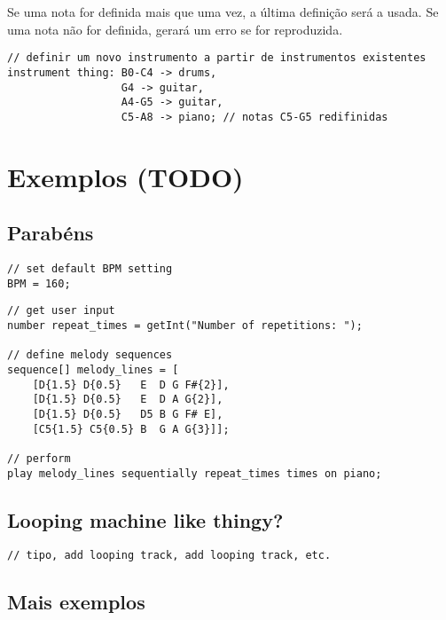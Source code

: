 \documentclass{article}
\begin{document}
Se uma nota for definida mais que uma vez, a última definição será a usada. Se uma nota não for definida, gerará um erro se for reproduzida.
\begin{lstlisting} 
// definir um novo instrumento a partir de instrumentos existentes
instrument thing: B0-C4 -> drums,
                  G4 -> guitar,
                  A4-G5 -> guitar, 
                  C5-A8 -> piano; // notas C5-G5 redifinidas
\end{lstlisting}


\section{Exemplos (TODO)} \label{example}
\subsection{Parabéns}
\begin{lstlisting}[caption=parabens.auxiliar]
// set default BPM setting
BPM = 160;
\end{lstlisting}

\begin{lstlisting}[caption=parabens.principal]
// get user input
number repeat_times = getInt("Number of repetitions: ");

// define melody sequences
sequence[] melody_lines = [
    [D{1.5} D{0.5}   E  D G F#{2}], 
    [D{1.5} D{0.5}   E  D A G{2}],
    [D{1.5} D{0.5}   D5 B G F# E],
    [C5{1.5} C5{0.5} B  G A G{3}]];

// perform
play melody_lines sequentially repeat_times times on piano;
\end{lstlisting}

\subsection{Looping machine like thingy?}
\begin{lstlisting} 
// tipo, add looping track, add looping track, etc.
\end{lstlisting}

\subsection{Mais exemplos}
\begin{lstlisting} 
\end{lstlisting}

% 
% 
\end{document}
